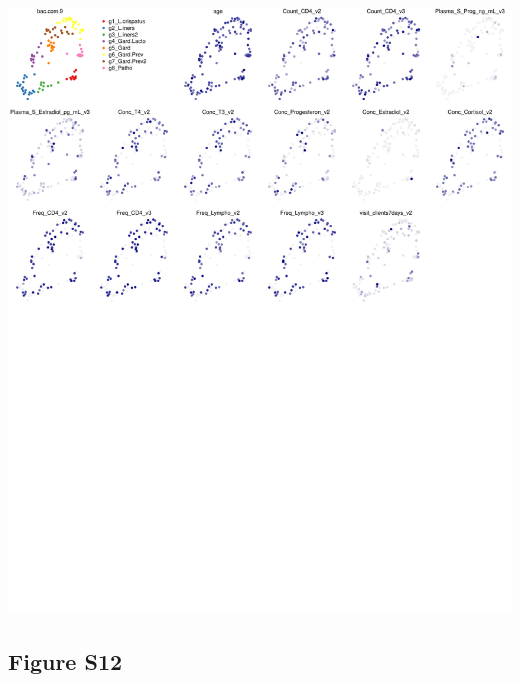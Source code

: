 \documentclass[
]{article}
\begin{document}
\includegraphics[width=1\linewidth]{manuscript_template_files/figure-latex/unnamed-chunk-22-1}

\clearpage

\hypertarget{figure-s12}{%
\subsection{Figure S12}\label{figure-s12}}
\end{document}
